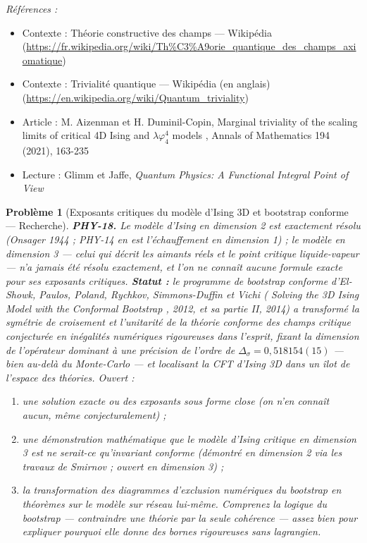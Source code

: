 \documentclass[11pt]{article}
\newtheorem{problem}{Problème}
\newenvironment{refs}{\par\small\noindent\emph{Références :}\begin{itemize}\setlength\itemsep{0pt}}{\end{itemize}\normalsize}
\begin{document}
\begin{refs}
\item Contexte : Théorie constructive des champs --- Wikipédia (\url{https://fr.wikipedia.org/wiki/Th%C3%A9orie_quantique_des_champs_axiomatique})
\item Contexte : Trivialité quantique --- Wikipédia (en anglais) (\url{https://en.wikipedia.org/wiki/Quantum_triviality})
\item Article : M. Aizenman et H. Duminil-Copin, \og{} Marginal triviality of the scaling limits of critical 4D Ising and $\lambda\varphi_4^4$ models \fg{}, Annals of Mathematics 194 (2021), 163-235
\item Lecture : Glimm et Jaffe, \textit{Quantum Physics: A Functional Integral Point of View}
\end{refs}

\bigskip

\begin{problem}[{Exposants critiques du modèle d'Ising 3D et bootstrap conforme --- Recherche}]
\textbf{PHY-18.} Le modèle d'Ising en dimension 2 est exactement résolu (Onsager 1944 ; PHY-14
en est l'échauffement en dimension 1) ; le modèle en dimension 3 --- celui qui décrit les aimants
réels et le point critique liquide-vapeur --- n'a jamais été résolu exactement, et l'on ne connaît
aucune formule exacte pour ses exposants critiques. \textbf{Statut :} le programme de bootstrap
conforme d'El-Showk, Paulos, Poland, Rychkov, Simmons-Duffin et Vichi (\og{} Solving the 3D Ising Model
with the Conformal Bootstrap \fg{}, 2012, et sa partie II, 2014) a transformé la symétrie de croisement
et l'unitarité de la théorie conforme des champs critique conjecturée en inégalités numériques
rigoureuses dans l'esprit, fixant la dimension de l'opérateur dominant à une précision de l'ordre
de $\Delta_\sigma = 0{,}518154(15)$ --- bien au-delà du Monte-Carlo --- et localisant la CFT d'Ising
3D dans un \og{} îlot \fg{} de l'espace des théories. Ouvert :
\begin{enumerate}
\item[(a)] une solution exacte ou des exposants sous forme close (on n'en connaît aucun, même
conjecturalement) ;
\item[(b)] une démonstration mathématique que le modèle d'Ising critique en dimension 3 est ne serait-ce
qu'invariant conforme (démontré en dimension 2 via les travaux de Smirnov ; ouvert en dimension
3) ;
\item[(c)] la transformation des diagrammes d'exclusion numériques du bootstrap en théorèmes sur le
modèle sur réseau lui-même. Comprenez la logique du bootstrap --- contraindre une théorie par la
seule cohérence --- assez bien pour expliquer pourquoi elle donne des bornes rigoureuses sans
lagrangien.
\end{enumerate}

\end{problem}
\end{document}
